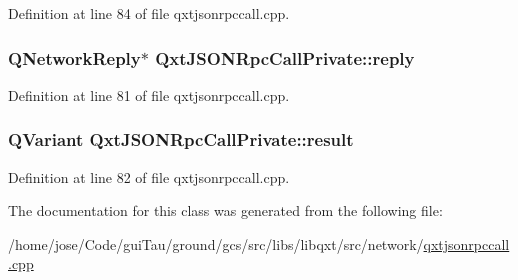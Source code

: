 Definition at line 84 of file qxtjsonrpccall.\-cpp.

\hypertarget{class_qxt_j_s_o_n_rpc_call_private_a44b06611f3109a71610097ca750e48e1}{
\subsubsection[{reply}]{\setlength{\rightskip}{0pt plus 5cm}Q\-Network\-Reply$\ast$ Qxt\-J\-S\-O\-N\-Rpc\-Call\-Private\-::reply}}\label{class_qxt_j_s_o_n_rpc_call_private_a44b06611f3109a71610097ca750e48e1}


Definition at line 81 of file qxtjsonrpccall.\-cpp.

\hypertarget{class_qxt_j_s_o_n_rpc_call_private_ac70e863bcf0d9947653d8abca106b668}{
\subsubsection[{result}]{\setlength{\rightskip}{0pt plus 5cm}Q\-Variant Qxt\-J\-S\-O\-N\-Rpc\-Call\-Private\-::result}}\label{class_qxt_j_s_o_n_rpc_call_private_ac70e863bcf0d9947653d8abca106b668}


Definition at line 82 of file qxtjsonrpccall.\-cpp.



The documentation for this class was generated from the following file\-:\begin{DoxyCompactItemize}
\item 
/home/jose/\-Code/gui\-Tau/ground/gcs/src/libs/libqxt/src/network/\hyperlink{qxtjsonrpccall_8cpp}{qxtjsonrpccall.\-cpp}\end{DoxyCompactItemize}
